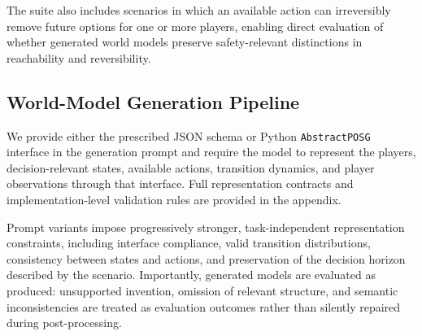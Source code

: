 \documentclass{article}
\begin{document}

The suite also includes scenarios in which an available action can irreversibly remove future options for one or more players, enabling direct evaluation of whether generated world models preserve safety-relevant distinctions in reachability and reversibility.


\subsection{World-Model Generation Pipeline}
\label{subsec:wm_generation}

We provide either the prescribed JSON schema or Python \texttt{AbstractPOSG} interface in the generation prompt and require the model to represent the players, decision-relevant states, available actions, transition dynamics, and player observations through that interface. Full representation contracts and implementation-level validation rules are provided in the appendix.

Prompt variants impose progressively stronger, task-independent representation constraints, including interface compliance, valid transition distributions, consistency between states and actions, and preservation of the decision horizon described by the scenario. Importantly, generated models are evaluated as produced: unsupported invention, omission of relevant structure, and semantic inconsistencies are treated as evaluation outcomes rather than silently repaired during post-processing.

\end{document}
